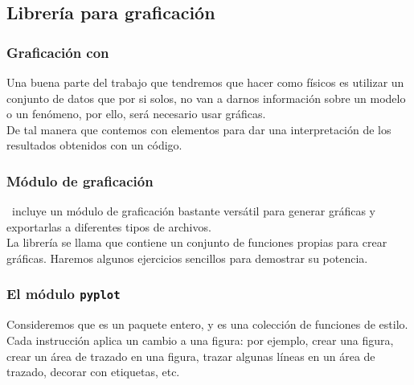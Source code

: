 \subsection{Librería para graficación}
\begin{frame}
\frametitle{Graficación con \python}
Una buena parte del trabajo que tendremos que hacer como físicos es utilizar un conjunto de datos que por si solos, no van a darnos información sobre un modelo o un fenómeno, por ello, será necesario usar gráficas.
\\
\bigskip
De tal manera que contemos con elementos para dar una interpretación de los resultados obtenidos con un código.
\end{frame}
\begin{frame}
\frametitle{Módulo de graficación}
\python\ incluye un módulo de graficación bastante versátil para generar gráficas y exportarlas a diferentes tipos de archivos.
\\
\medskip
La librería se llama  que contiene un conjunto de funciones propias para crear gráficas. Haremos algunos ejercicios sencillos para demostrar su potencia.
\end{frame}
\begin{frame}
\frametitle{El módulo \texttt{pyplot}}
Consideremos que  es un paquete entero, y  es una colección de funciones de estilo.
\\
\bigskip
\pause
Cada instrucción  aplica un cambio a una figura: por ejemplo, crear una figura, crear un área de trazado en una figura, trazar algunas líneas en un área de trazado, decorar con etiquetas, etc.
\end{frame}
